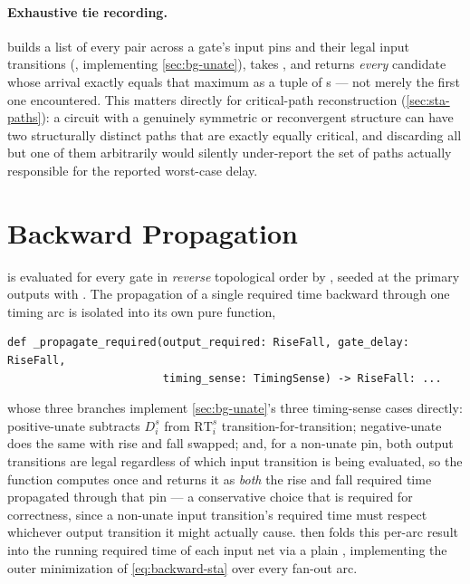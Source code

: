\paragraph{Exhaustive tie recording.}  builds a
list of every  pair across a gate's input pins and their legal input
transitions (, implementing
\cref{sec:bg-unate}), takes , and returns
\emph{every} candidate whose arrival exactly equals that maximum as a tuple
of s --- not merely the first one encountered. This
matters directly for critical-path reconstruction (\cref{sec:sta-paths}): a
circuit with a genuinely symmetric or reconvergent structure can have two
structurally distinct paths that are exactly equally critical, and
discarding all but one of them arbitrarily would silently under-report the
set of paths actually responsible for the reported worst-case delay.

\section{Backward Propagation}
\label{sec:sta-backward}

 is evaluated for every gate in \emph{reverse}
topological order by , seeded at the
primary outputs with . The
propagation of a single required time backward through one timing arc is
isolated into its own pure function,

\begin{lstlisting}[style=pythonstyle, numbers=none]
def _propagate_required(output_required: RiseFall, gate_delay: RiseFall,
                        timing_sense: TimingSense) -> RiseFall: ...
\end{lstlisting}

whose three branches implement \cref{sec:bg-unate}'s three timing-sense
cases directly: positive-unate subtracts $D_i^{s}$ from
$\mathrm{RT}_i^{s}$ transition-for-transition; negative-unate does the same
with rise and fall swapped; and, for a non-unate pin, both output
transitions are legal regardless of which input transition is being
evaluated, so the function computes
 once and returns it as
\emph{both} the rise and fall required time propagated through that pin --- a
conservative choice that is required for correctness, since a non-unate
input transition's required time must respect whichever output transition
it might actually cause.  then folds this
per-arc result into the running required time of each input net via a
plain , implementing the outer minimization of
\cref{eq:backward-sta} over every fan-out arc.

